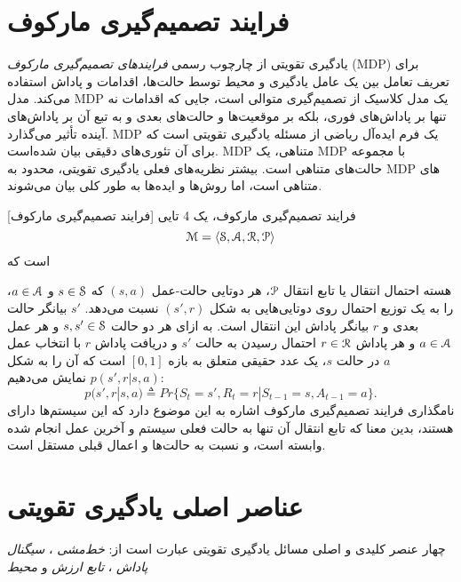 \section{فرایند تصمیم‌گیری مارکوف}

یادگیری تقویتی از چارچوب رسمی \textit{فرایندهای تصمیم‌گیری مارکوف} 
 (MDP)
 برای تعریف تعامل بین یک عامل یادگیری و محیط توسط حالت‌ها، اقدامات و پاداش استفاده می‌کند. مدل MDP یک مدل کلاسیک از تصمیم‌گیری متوالی است، جایی که اقدامات نه تنها بر پاداش‌های فوری، بلکه بر موقعیت‌ها و حالت‌های بعدی و به تبع آن بر پاداش‌های آینده تأثیر می‌گذارد.
MDP
 یک فرم ایده‌آل ریاضی از مسئله یادگیری تقویتی است که برای آن تئوری‌های دقیقی بیان شده‌است.
MDP متناهی،
 یک MDP با مجموعه حالت‌های متناهی است. 
بیشتر نظریه‌های فعلی یادگیری تقویتی، محدود به MDP  های متناهی است، اما روش‌ها و ایده‌ها به طور کلی بیان می‌شوند.


[فرایند تصمیم‌گیری مارکوف] 
 فرایند تصمیم‌گیری مارکوف، یک 4 تایی 
$$\EuScript{M} = \left< \EuScript{S},\EuScript{A},\EuScript{R},\EuScript{P} \right>$$
است که


هسته احتمال انتقال یا تابع انتقال $\EuScript{P}$، هر دوتایی حالت-عمل
$(s,a)$ که 
$s \in \EuScript{S}$
و
$a \in \EuScript{A}$، را به یک توزیع احتمال روی دوتایی‌هایی به شکل 
$(s',r)$
نسبت می‌دهد. $s'$ بیانگر حالت بعدی و $r$ بیانگر پاداش این انتقال است. به ازای هر دو حالت 
$s,s' \in \EuScript{S}$
 و هر عمل 
 $a \in \EuScript{A}$
  و هر پاداش 
  $r \in \EuScript{R}$
  احتمال رسیدن به حالت $s'$ و دریافت پاداش $r$ با انتخاب عمل $a$ در حالت $s$، یک عدد حقیقی متعلق به  بازه $[0,1]$ است که آن را به شکل
$p(s',r|s,a)$
نمایش می‌دهیم:
$$p(s',r|s,a) \triangleq Pr\{S_t=s',R_t=r|S_{t-1}=s,A_{t-1}=a\}.$$ 
نامگذاری فرایند تصمیم‌گیری مارکوف اشاره به این موضوع دارد که این سیستم‌ها دارای   هستند، بدین معنا که تابع انتقال آن تنها به حالت فعلی سیستم و آخرین عمل انجام شده وابسته است، و نسبت به حالت‌ها و اعمال قبلی مستقل است.
\section{عناصر اصلی یادگیری تقویتی}
چهار عنصر کلیدی و اصلی مسائل یادگیری تقویتی عبارت است از:
\textit{خط‌مشی} ، 
\textit{سیگنال پاداش} ،
\textit{تابع ارزش}  
و
\textit{محیط} 

